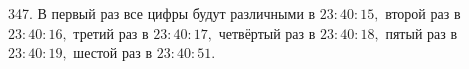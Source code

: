 347. В первый раз все цифры будут различными в $23:40:15,$ второй раз в $23:40:16,$ третий раз в $23:40:17,$ четвёртый раз в $23:40:18,$ пятый раз в $23:40:19,$ шестой раз в $23:40:51.$\\
